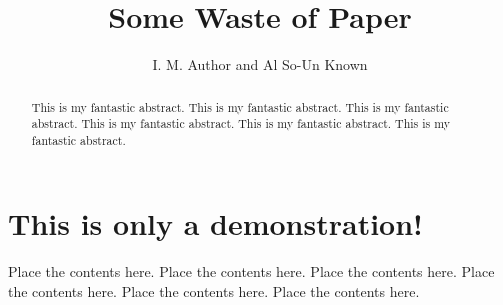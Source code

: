 \documentclass[a4paper]{article}
\begin{document}
\title{Some Waste of Paper}
\author{I. M. Author and Al So-Un Known}
\maketitle

\begin{abstract}
This is my fantastic abstract.
This is my fantastic abstract.
This is my fantastic abstract.
This is my fantastic abstract.
This is my fantastic abstract.
This is my fantastic abstract.
\end{abstract}

\section{This is only a demonstration!}
Place the contents here.
Place the contents here.
Place the contents here.
Place the contents here.
Place the contents here.
Place the contents here.
\end{document}
